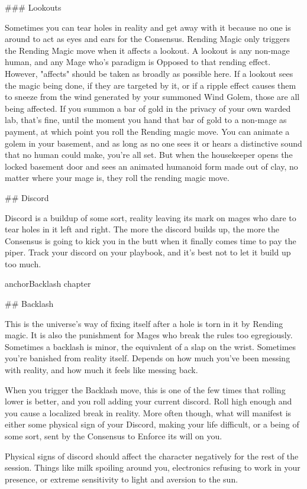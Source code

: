 \documentclass[
  oneside,
  statementpaper,
  9pt]{memoir}
\begin{document}
\begin{Player}
### Lookouts

Sometimes you can tear holes in reality and get away with it because no one is around to act as eyes and ears for the Consensus. Rending Magic only triggers the Rending Magic move when it affects a lookout. A lookout is any non-mage human, and any Mage who’s paradigm is Opposed to that rending effect. However, "affects" should be taken as broadly as possible here. If a lookout sees the magic being done, if they are targeted by it, or if a ripple effect causes them to sneeze from the wind generated by your summoned Wind Golem, those are all being affected. If you summon a bar of gold in the privacy of your own warded lab, that’s fine, until the moment you hand that bar of gold to a non-mage as payment, at which point you roll the Rending magic move. You can animate a golem in your basement, and as long as no one sees it or hears a distinctive sound that no human could make, you’re all set. But when the housekeeper opens the locked basement door and sees an animated humanoid form made out of clay, no matter where your mage is, they roll the rending magic move.

## Discord

Discord is a buildup of some sort, reality leaving its mark on mages who dare to tear holes in it left and right. The more the discord builds up, the more the Consensus is going to kick you in the butt when it finally comes time to pay the piper. Track your discord on your playbook, and it’s best not to let it build up too much.


{{anchorBacklash chapter}}

## Backlash

This is the universe’s way of fixing itself after a hole is torn in it by Rending magic. It is also the punishment for Mages who break the rules too egregiously. Sometimes a backlash is minor, the equivalent of a slap on the wrist. Sometimes you’re banished from reality itself. Depends on how much you’ve been messing with reality, and how much it feels like messing back.

When you trigger the Backlash move, this is one of the few times that rolling lower is better, and you roll adding your current discord. Roll high enough and you cause a localized break in reality. More often though, what will manifest is either some physical sign of your Discord, making your life difficult, or a being of some sort, sent by the Consensus to Enforce its will on you. 

Physical signs of discord should affect the character negatively for the rest of the session. Things like milk spoiling around you, electronics refusing to work in your presence, or extreme sensitivity to light and aversion to the sun. 


\end{Player}
\end{document}
